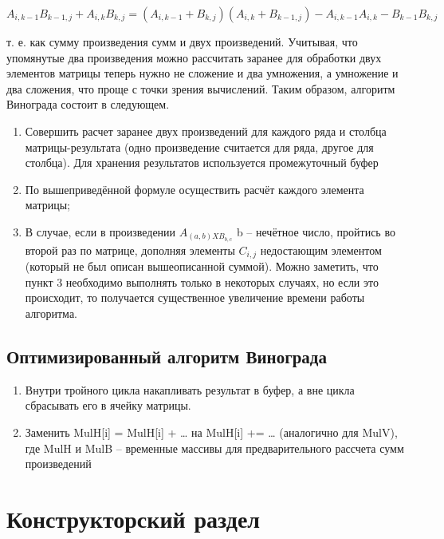 \documentclass[a4paper, 14pt]{article}
\begin{document}
	\begin{math}
		A_{i, k-1}B_{k-1,j} + A_{i,k}B_{k,j} = (A_{i,k-1} + B_{k,j})(A_{i,k} + B_{k-1,j}) - A_{i,k-1}A_{i,k} - B_{k-1}B_{k,j}
	\end{math}
	
	т. е. как сумму произведения сумм и двух произведений. Учитывая, что упомянутые два произведения можно рассчитать заранее для обработки двух элементов матрицы теперь нужно не сложение и два умножения, а умножение и два сложения, что проще с точки зрения вычислений. Таким образом, алгоритм Винограда состоит в следующем.
	
	\begin{enumerate}
		\item Совершить расчет заранее двух произведений для каждого ряда и столбца матрицы-результата (одно произведение считается для ряда, другое для столбца). Для хранения результатов используется промежуточный буфер
		\item По вышеприведённой формуле осуществить расчёт каждого элемента матрицы;
		\item В случае, если в произведении $A_{(a,b) X B_{b,c}}$ b – нечётное число, пройтись во второй раз по матрице, дополняя элементы $C_{i,j}$ недостающим элементом (который не был описан вышеописанной суммой). Можно заметить, что пункт 3 необходимо выполнять только в некоторых случаях, но если это происходит, то получается существенное увеличение времени работы алгоритма.
	\end{enumerate} 
	
	\subsection{Оптимизированный алгоритм Винограда}
	
	\begin{enumerate}
		\item Внутри тройного цикла накапливать результат в буфер, а вне цикла сбрасывать его в ячейку матрицы.
		\item Заменить MulH[i] = MulH[i] + … на MulH[i] += … (аналогично для MulV),
		где MulH и MulB – временные массивы для предварительного рассчета сумм произведений
		
	\end{enumerate}
	
	\newpage
	\section{Конструкторский раздел}
	
\end{document}
